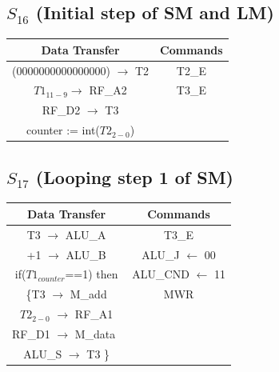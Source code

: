 \documentclass[]{report}
\begin{document}
            \subsection*{$S_{16}$ (Initial step of SM and LM)} %
            \begin{center}
                \begin{tabular}{|c|c|}
                    \hline
                    Data Transfer & Commands \\
                    \hline
                    (0000000000000000) $\to$ T2 & T2\_E\\
                    $T1_{11-9} \to$ RF\_A2 & T3\_E\\
                    RF\_D2 $\to$ T3 & \\
                    counter := int($T2_{2-0}$) & \\
                    \hline
                \end{tabular}
            \end{center}            
            \subsection*{$S_{17}$ (Looping step 1 of SM)} %
            \begin{center}
                \begin{tabular}{|c|c|}
                    \hline
                    Data Transfer & Commands \\
                    \hline
                    T3 $\to$ ALU\_A & T3\_E\\
                    +1 $\to$ ALU\_B & ALU\_J $\leftarrow$ 00\\
                    if($T1_{counter}$==1) then & ALU\_CND $\leftarrow$ 11\\
                    \{T3 $\to$ M\_add& MWR\\
                    $T2_{2-0}$ $\to$ RF\_A1 & \\
                    RF\_D1 $\to$ M\_data\ & \\
                    ALU\_S $\to$ T3 \} & \\ 
                    \hline
                \end{tabular}
            \end{center} 
\end{document}
